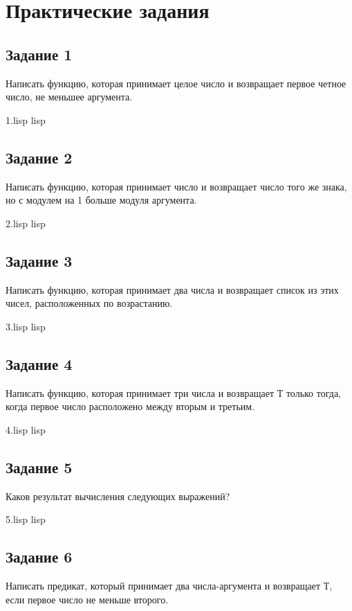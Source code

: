 \chapter{Практические задания}

\section{Задание 1}
Написать функцию, которая принимает целое число и возвращает первое четное число, не меньшее аргумента.

{1.lisp}
{lisp}
{}

\section{Задание 2}
Написать функцию, которая принимает число и возвращает число того же знака, но с модулем на 1 больше модуля аргумента.

{2.lisp}
{lisp}
{}

\section{Задание 3}
Написать функцию, которая принимает два числа и возвращает список из этих чисел, расположенных по возрастанию.

{3.lisp}
{lisp}
{}

\clearpage

\section{Задание 4}
Написать функцию, которая принимает три числа и возвращает Т только тогда, когда первое число расположено между вторым и третьим.

{4.lisp}
{lisp}
{}

\section{Задание 5}
Каков результат вычисления следующих выражений?

{5.lisp}
{lisp}
{}

\section{Задание 6}
Написать предикат, который принимает два числа-аргумента и возвращает Т, если первое число не меньше второго.

